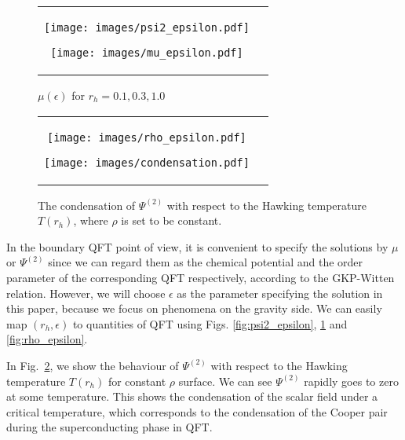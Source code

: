 \documentclass[a4paper,11pt]{article}
\begin{document}
\begin{figure}[htbp]
	\begin{tabular}{cc}
	\begin{minipage}{.45\textwidth}
        \centering
        \texttt{[image: images/psi2\_epsilon.pdf]}
        \caption{$\Psi^{(2)}(\epsilon)$ for $r_h=0.1, 0.3, 1.0$}
        \label{fig:psi2_epsilon}
	\end{minipage}
	\hspace{5mm}
	\begin{minipage}{.45\textwidth}
        \centering
        \texttt{[image: images/mu\_epsilon.pdf]}
        \caption{$\mu(\epsilon)$ for $r_h=0.1, 0.3, 1.0$}
        \label{fig:mu_epsilon}
	\end{minipage}
	\end{tabular}
\end{figure}
\begin{figure}[htbp]
	\begin{tabular}{cc}
	\begin{minipage}{.45\textwidth}
        \centering
        \texttt{[image: images/rho\_epsilon.pdf]}
        \caption{$\rho(\epsilon)$ for $r_h=0.1, 0.3, 1.0$}
        \label{fig:rho_epsilon}
	\end{minipage}
	\hspace{5mm}
	\begin{minipage}{.45\textwidth}
        \centering
        \texttt{[image: images/condensation.pdf]}
        \caption{The condensation of $\Psi^{(2)}$ with respect to the Hawking temperature $T(r_h)$, where $\rho$ is set to be constant.}
        \label{fig:condensation}
	\end{minipage}
	\end{tabular}
\end{figure}
    In the boundary QFT point of view, it is convenient to specify the solutions by $\mu$ or $\Psi^{(2)}$ since we can regard them as the chemical potential and the order parameter of the corresponding QFT respectively, according to the GKP-Witten relation. However, we will choose $\epsilon$ as the parameter specifying the solution in this paper, because we focus on phenomena on the gravity side. We can easily map $(r_h,\epsilon)$ to quantities of QFT using Figs. \ref{fig:psi2_epsilon}, \ref{fig:mu_epsilon} and \ref{fig:rho_epsilon}.



    In Fig.~\ref{fig:condensation}, we show the behaviour of $\Psi^{(2)}$ with respect to the Hawking temperature $T(r_h)$ for constant $\rho$ surface. 
    We can see $\Psi^{(2)}$ rapidly goes to zero at some temperature. 
    This shows the condensation of the scalar field under a critical temperature, which corresponds to the condensation of the Cooper pair during the superconducting phase in QFT. 
\end{document}
